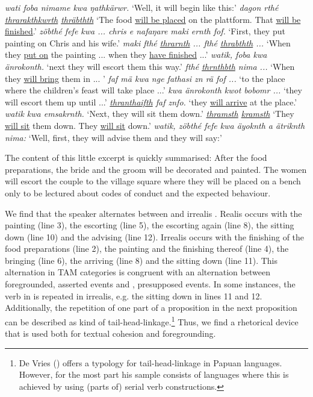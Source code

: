 \begin{exe}
\ex
\begin{xlist}
	 \emph{wati foba nimame kwa ŋathkärwr.}
	\trans `Well, it will begin like this:'
	 \emph{dagon rthé \uline{thrarakthkwrth} \uline{thräbthth}}
	\trans `The food \uline{will be placed} on the plattform. That \uline{will be finished}.'
	 \emph{zöbthé fefe kwa ... chris e nafaŋare maki ernth fof.}
	\trans `First, they put painting on Chris and his wife.'
	 \emph{maki fthé \uline{thrarnth} ... fthé \uline{thrabthth} ...}
	\trans `When they \uline{put on} the painting ... when they \uline{have finished} ...'
	 \emph{watik, foba kwa änrokonth.}
	\trans `next they will escort them this way.'
	 \emph{fthé \uline{thrnthbth} nima ...}
	\trans `When they \uline{will bring} them in ... '
	 \emph{faf mä kwa nge fathasi zn rä fof ...}
	\trans `to the place where the children's feast will take place ...'
	 \emph{kwa änrokonth kwot bobomr ...}
	\trans `they will escort them up until ...'
	 \emph{\uline{thranthaifth} faf znfo.}
	\trans `they \uline{will arrive} at the place.'
	 \emph{watik kwa emsakrnth.}
	\trans `Next, they will sit them down.'
	 \emph{\uline{thramsth} \uline{kramsth}}
	\trans `They \uline{will sit} them down. They \uline{will sit} down.'
	 \emph{watik, zöbthé fefe kwa äyoknth a ätriknth nima:}
	\trans `Well, first, they will advise them and they will say:'
\end{xlist}
\label{fathasitext}
\end{exe}

The content of this little excerpt is quickly summarised: After the food preparations, the bride and the groom will be decorated and painted. The women will escort the couple to the village square where they will be placed on a bench only to be lectured about codes of conduct and the expected behaviour.%

We find that the speaker alternates between  and irrealis . Realis occurs with the painting (line 3), the escorting (line 5), the escorting again (line 8), the sitting down (line 10) and the advising (line 12). Irrealis occurs with the finishing of the food preparations (line 2), the painting and the finishing thereof (line 4), the bringing (line 6), the arriving (line 8) and the sitting down (line 11). This alternation in TAM categories is congruent with an alternation between foregrounded, asserted events and , presupposed events. In some instances, the verb in  is repeated in irrealis, e.g. the sitting down in lines 11 and 12. Additionally, the repetition of one part of a proposition in the next proposition can be described as kind of tail-head-linkage.\footnote{De Vries (\citeyear{deVries:2005tm}) offers a typology for tail-head-linkage in Papuan languages. However, for the most part his sample consists of languages where this is achieved by using (parts of) serial verb constructions.} Thus, we find a rhetorical device that is used both for textual cohesion and foregrounding.%


